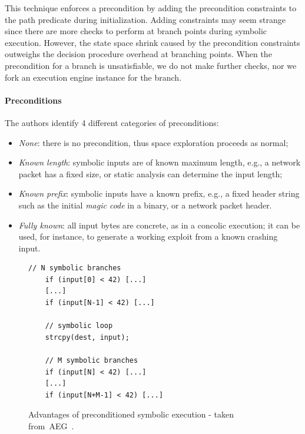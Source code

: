 This technique enforces a precondition by adding the precondition constraints to the path predicate during initialization. Adding constraints may seem strange since there are more checks to perform at branch points during symbolic execution. However, the state space shrink caused by the precondition constraints outweighs the decision procedure overhead at branching points. When the precondition for a branch is unsatisfiable, we do not make further checks, nor we fork an execution engine instance for the branch.%

\paragraph{Preconditions} The authors identify 4 different categories of preconditions:
\begin{itemize}
\item {\em None}: there is no precondition, thus space exploration proceeds as normal;
\item {\em Known length}: symbolic inputs are of known maximum length, e.g., a network packet has a fixed size, or static analysis can determine the input length;
\item {\em Known prefix}: symbolic inputs have a known prefix, e.g., a fixed header string such as the initial {\em magic code} in a binary, or a network packet header.
\item {\em Fully known}: all input bytes are concrete, as in a concolic execution; it can be used, for instance, to generate a working exploit from a known crashing input. 
\end{itemize}

\begin{figure}[!ht]
\begin{small}
\begin{lstlisting}[basicstyle=\ttfamily\small]
    // N symbolic branches 
    if (input[0] < 42) [...]
    [...]
    if (input[N-1] < 42) [...]

    // symbolic loop
    strcpy(dest, input); 

    // M symbolic branches
    if (input[N] < 42) [...]
    [...]
    if (input[N+M-1] < 42) [...]
\end{lstlisting}
\end{small}
\caption{\label{fig:preconditioned} Advantages of preconditioned symbolic execution - taken from~{\sc AEG}~\protect\cite{AEG-NDSS11}.}
\end{figure}

